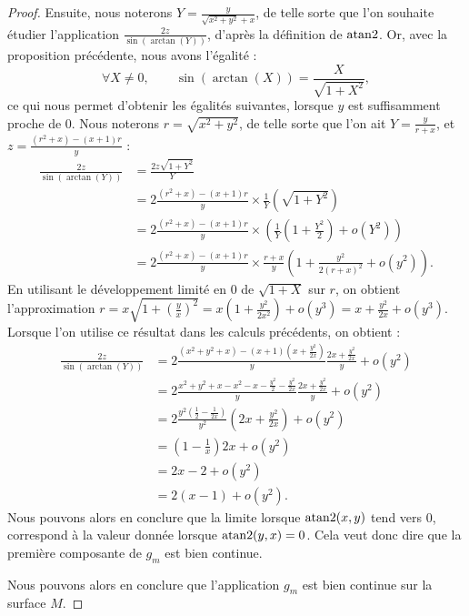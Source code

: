 \documentclass[hidelinks, 10pt]{article}
\begin{document}
\begin{proof}
Ensuite, nous noterons $Y=\frac{y}{\sqrt{x^2+y^2}+x}$, de telle sorte que l'on souhaite étudier l'application $\frac{2z}{\sin(\arctan(Y))}$, d'après la définition de $\mathrm{atan}2$. Or, avec la proposition précédente, nous avons l'égalité : \begin{equation}
    \forall X\neq0, \qquad \sin(\arctan(X))=\frac{X}{\sqrt{1+X^2}},
\end{equation}ce qui nous permet d'obtenir les égalités suivantes, lorsque $y$ est suffisamment proche de 0. Nous noterons $r=\sqrt{x^2+y^2}$, de telle sorte que l'on ait $Y=\frac{y}{r+x}$, et $z=\frac{(r^2+x)-(x+1)r}{y}$ : \[\begin{split}
\frac{2z}{\sin(\arctan(Y))}&=\frac{2z\sqrt{1+Y^2}}{Y}\\
&=2\frac{(r^2+x)-(x+1)r}{y}\times\frac{1}{Y}(\sqrt{1+Y^2})\\
&=2\frac{(r^2+x)-(x+1)r}{y}\times\left(\frac{1}{Y}\left(1+\frac{Y^2}{2}\right)+o(Y^2)\right)\\%
&=2\frac{(r^2+x)-(x+1)r}{y}\times\frac{r+x}{y}\left(1+\frac{y^2}{2(r+x)^2}+o(y^2)\right).
\end{split}\]En utilisant le développement limité en 0 de $\sqrt{1+X}$ sur $r$, on obtient l'approximation $r=x\sqrt{1+\left(\frac{y}{x}\right)^2}=x\left(1+\frac{y^2}{2x^2}\right)+o(y^3)=x+\frac{y^2}{2x}+o(y^3)$. Lorsque l'on utilise ce résultat dans les calculs précédents, on obtient : \[\begin{split}
\frac{2z}{\sin(\arctan(Y))}&=2\frac{(x^2+y^2+x)-(x+1)(x+\frac{y^2}{2x})}{y}\frac{2x+\frac{y^2}{2x}}{y}+o(y^2)\\
&=2\frac{x^2+y^2+x-x^2-x-\frac{y^2}{2}-\frac{y^2}{2x}}{y}\frac{2x+\frac{y^2}{2x}}{y}+o(y^2)\\
&=2\frac{y^2(\frac{1}{2}-\frac{1}{2x})}{y^2}\left(2x+\frac{y^2}{2x}\right)+o(y^2)\\
&=\left(1-\frac{1}{x}\right)2x+o(y^2)\\
&=2x-2+o(y^2)\\
&=2(x-1)+o(y^2).
\end{split}\]Nous pouvons alors en conclure que la limite lorsque $\mathrm{atan}2(x,y)$ tend vers 0, correspond à la valeur donnée lorsque $\mathrm{atan}2(y,x)=0$. Cela veut donc dire que la première composante de $g_m$ est bien continue.

Nous pouvons alors en conclure que l'application $g_m$ est bien continue sur la surface $M$.
\end{proof}
\end{document}
